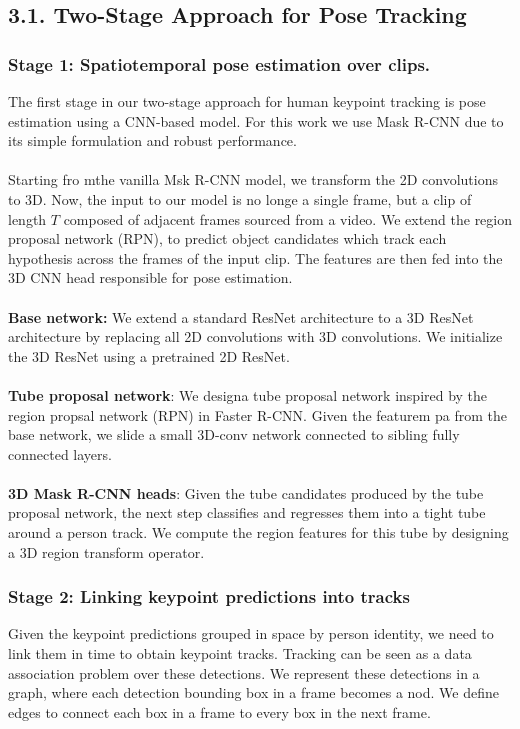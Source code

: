 \documentclass[a4paper]{report}
\begin{document}
\subsection*{3.1. Two-Stage Approach for Pose Tracking}
\subsubsection*{Stage 1: Spatiotemporal pose estimation over clips.}
The first stage in our two-stage approach for human keypoint tracking is pose estimation using a CNN-based model. For this work we use Mask R-CNN due to its simple formulation and robust performance. 
\\
\\
Starting fro mthe vanilla Msk R-CNN model, we transform the 2D convolutions to 3D. Now, the input to our model is no longe a single frame, but a clip of length $T$ composed of adjacent frames sourced from a video. We extend the region proposal network (RPN), to predict object candidates which track each hypothesis across the frames of the input clip. The features are then fed into the 3D CNN head responsible for pose estimation. 
\\
\\
\textbf{Base network:} We extend a standard ResNet architecture to a 3D ResNet architecture by replacing all 2D convolutions with 3D convolutions. We initialize the 3D ResNet using a pretrained 2D ResNet.
\\
\\
\textbf{Tube proposal network}: We designa  tube proposal network inspired by the region propsal network (RPN) in Faster R-CNN. Given the featurem pa from the base network, we slide a small 3D-conv network connected to sibling fully connected layers.
\\
\\
\textbf{3D Mask R-CNN heads}: Given the tube candidates produced by the tube proposal network, the next step classifies and regresses them into a tight tube around a person track. We compute the region features for this tube by designing a 3D region transform operator.

\subsubsection*{Stage 2: Linking keypoint predictions into tracks}
Given the keypoint predictions grouped in space by person identity, we need to link them in time to obtain keypoint tracks. Tracking can be seen as a data association problem over these detections. We represent these detections in a graph, where each detection bounding box in a frame becomes a nod. We define edges to connect each box in a frame to every box in the next frame.
\end{document}
